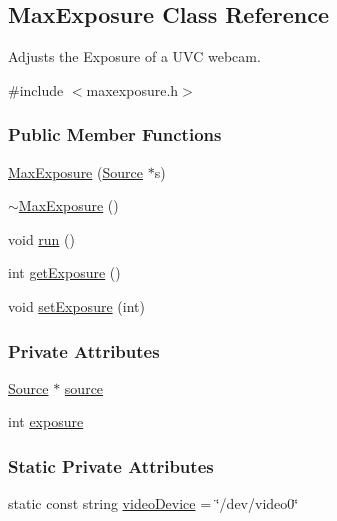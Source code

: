 \hypertarget{classMaxExposure}{\subsection{\-Max\-Exposure \-Class \-Reference}
\label{classMaxExposure}
}


\-Adjusts the \-Exposure of a \-U\-V\-C webcam.  




{\ttfamily \#include $<$maxexposure.\-h$>$}

\subsubsection*{\-Public \-Member \-Functions}
\begin{DoxyCompactItemize}
\item 
\hyperlink{classMaxExposure_a6d3037d9bf2c0f59618379f9580b6f7c}{\-Max\-Exposure} (\hyperlink{classSource}{\-Source} $\ast$s)
\item 
\hyperlink{classMaxExposure_a5bff32bca556d218489941846a27b9ff}{$\sim$\-Max\-Exposure} ()
\item 
void \hyperlink{classMaxExposure_a27c34fb49f7b9cd77c679ea9bc7dadc4}{run} ()
\item 
int \hyperlink{classMaxExposure_a0ad2c377e1f117962d7747758e8118a6}{get\-Exposure} ()
\item 
void \hyperlink{classMaxExposure_a2fe0341425b8821e5c9e82ce3cc0b346}{set\-Exposure} (int)
\end{DoxyCompactItemize}
\subsubsection*{\-Private \-Attributes}
\begin{DoxyCompactItemize}
\item 
\hyperlink{classSource}{\-Source} $\ast$ \hyperlink{classMaxExposure_a80825e655ef83dad0d95b50befdf0580}{source}
\item 
int \hyperlink{classMaxExposure_a0edc3ff74bb09c91f812be79cf2f8612}{exposure}
\end{DoxyCompactItemize}
\subsubsection*{\-Static \-Private \-Attributes}
\begin{DoxyCompactItemize}
\item 
static const string \hyperlink{classMaxExposure_a3c4c2e4996102280ad51357283dea7f2}{video\-Device} = \char`\"{}/dev/video0\char`\"{}
\end{DoxyCompactItemize}


